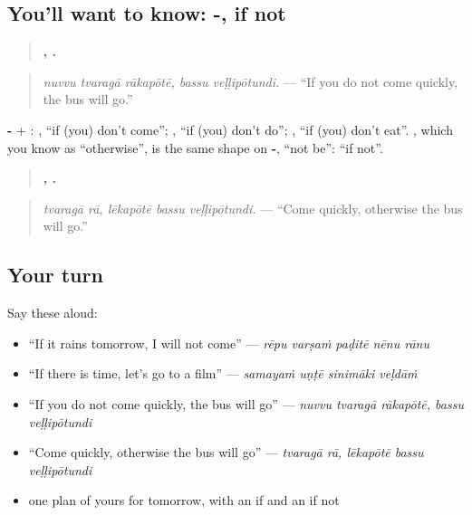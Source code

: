 \subsection*{You'll want to know: -, if not}
\begin{quote}
\textbf{  ,  .}
\end{quote}

\begin{quote}
\emph{nuvvu tvaragā rākapōtē, bassu veḷḷipōtundi.} — \textquotedblleft{}If you do not come quickly, the bus will go.\textquotedblright{}
\end{quote}

\textbf{-} + \textbf{}: \textbf{}, \textquotedblleft{}if (you) don't come\textquotedblright{}; \textbf{}, \textquotedblleft{}if (you) don't do\textquotedblright{}; \textbf{}, \textquotedblleft{}if (you) don't eat\textquotedblright{}. \textbf{}, which you know as \textquotedblleft{}otherwise\textquotedblright{}, is the same shape on \textbf{-}, \textquotedblleft{}not be\textquotedblright{}: \textquotedblleft{}if not\textquotedblright{}.

\begin{quote}
\textbf{ ,   .}
\end{quote}

\begin{quote}
\emph{tvaragā rā, lēkapōtē bassu veḷḷipōtundi.} — \textquotedblleft{}Come quickly, otherwise the bus will go.\textquotedblright{}
\end{quote}

\subsection*{Your turn}
Say these aloud:

\begin{itemize}
\raggedright
  \item \textquotedblleft{}If it rains tomorrow, I will not come\textquotedblright{} — \emph{rēpu varṣaṁ paḍitē nēnu rānu}
  \item \textquotedblleft{}If there is time, let's go to a film\textquotedblright{} — \emph{samayaṁ uṇṭē sinimāki veḷdāṁ}
  \item \textquotedblleft{}If you do not come quickly, the bus will go\textquotedblright{} — \emph{nuvvu tvaragā rākapōtē, bassu veḷḷipōtundi}
  \item \textquotedblleft{}Come quickly, otherwise the bus will go\textquotedblright{} — \emph{tvaragā rā, lēkapōtē bassu veḷḷipōtundi}
  \item one plan of yours for tomorrow, with an if and an if not
\end{itemize}

